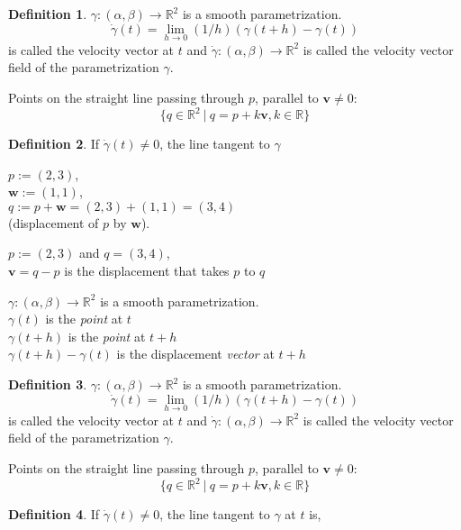 \documentclass[twocolumn,20pt,fleqn]{extarticle}
\newcommand{\sep}{\vspace{0.5cm}}
\theoremstyle{plain}
\theoremstyle{definition}
\newtheorem*{definition}{Definition}
\theoremstyle{remark}
\begin{document}
\begin{definition}
$\gamma : (\alpha,\beta) \to \mathbb{R}^2$ is a smooth parametrization.
\[\dot{\gamma}(t) = \lim_{h\to 0} (1/h)(\gamma(t+h) - \gamma(t))\]
is called the velocity vector at $t$ and $\dot{\gamma} : (\alpha, \beta) \to \mathbb{R}^2$ is called the velocity vector field of the parametrization $\gamma$.
\end{definition}
\newpage
Points on the straight line passing through $p$, parallel to $\mathbf{v}\neq 0$:
\[\{q \in \mathbb{R}^2 \ |\ q = p  + k\mathbf{v} , k \in \mathbb{R}\}\]

\begin{definition}
  If $\dot{\gamma}(t)\neq 0$, the line tangent to $\gamma$\end{definition}


\clearpage



$p := (2,3)$,\\ $\mathbf{w} := (1,1)$,\\ $q:=p + \mathbf{w} = (2,3) + (1,1) = (3,4)$ \\ (displacement of $p$ by $\mathbf{w}$).

\sep
$p := (2,3)$ and $q=(3,4)$,\\
$\mathbf{v}= q - p$ is the displacement that takes $p$ to $q$ 
\sep

$\gamma : (\alpha,\beta) \to \mathbb{R}^2$ is a smooth parametrization.\\
$\gamma(t)$ is the \emph{point} at $t$\\
$\gamma(t+h)$ is the \emph{point} at $t+h$\\
$\gamma(t+h)-\gamma(t)$ is the displacement \emph{vector} at $t+h$\\



\begin{definition}
$\gamma : (\alpha,\beta) \to \mathbb{R}^2$ is a smooth parametrization.
\[\dot{\gamma}(t) = \lim_{h\to 0} (1/h)(\gamma(t+h) - \gamma(t))\]
is called the velocity vector at $t$ and $\dot{\gamma} : (\alpha, \beta) \to \mathbb{R}^2$ is called the velocity vector field of the parametrization $\gamma$.
\end{definition}
\newpage
Points on the straight line passing through $p$, parallel to $\mathbf{v}\neq 0$:
\[\{q \in \mathbb{R}^2 \ |\ q = p  + k\mathbf{v} , k \in \mathbb{R}\}\]

\begin{definition}
  If $\dot{\gamma}(t)\neq 0$, the line tangent to $\gamma$ at $t$ is,\end{definition}
\end{document}
